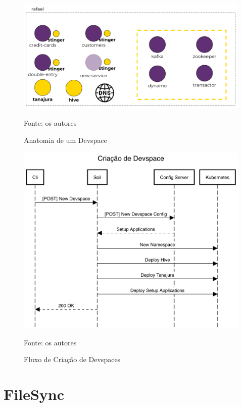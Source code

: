 \documentclass[twosideprint]{politex}
\newcommand{\legend}[1]{\begin{center}\def\caption{}\caption{#1}\end{center}}
\begin{document}
        \begin{figure}[htbp]
			\caption{\label{fig_devspace1}Anatomia de um Devspace}
			\begin{center}
			\includegraphics[scale=0.30]{pictures/devspace1.png}
			\end{center}
			\legend{Fonte: os autores}
		\end{figure}
    
    	\begin{figure}[htbp]
			\caption{\label{fig_create_devspace}Fluxo de Criação de Devspaces}
			\begin{center}
			\includegraphics[scale=0.40]{pictures/create-devspace.png}
			\end{center}
			\legend{Fonte: os autores}
		\end{figure}

	\section{FileSync}
\end{document}
